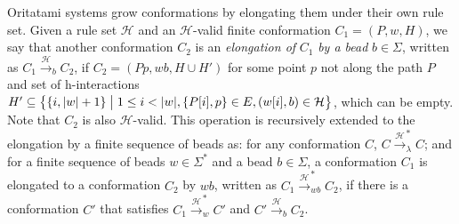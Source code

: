 \documentclass[dvipdfmx,review]{elsarticle}
\begin{document}
Oritatami systems grow conformations by elongating them under their own rule set. 
Given a rule set $\mathcal{H}$ and an $\mathcal{H}$-valid finite conformation $C_1 = (P, w, H)$, 
we say that another conformation $C_2$ is an \textit{elongation of} $C_1$ \textit{by a bead} $b \in \Sigma$, written as $C_1 \xrightarrow{\mathcal{H}}_b C_2$, if $C_2 = (Pp, wb, H \cup H')$ for some point $p$ not along the path $P$ and set of h-interactions $H' \subseteq \left\{ \{i, |w|+1\} \bigm| 1\leq i < |w|, \{P[i], p\} \in E, (w[i], b) \in \mathcal{H}\right\}$, which can be empty.
Note that $C_2$ is also $\mathcal{H}$-valid.
This operation is recursively extended to the elongation by a finite sequence of beads as: 
for any conformation $C$, $C \xrightarrow{\mathcal{H}}^*_\lambda C$; 
and for a finite sequence of beads $w \in \Sigma^*$ and a bead $b \in \Sigma$,
a conformation $C_1$ is elongated to a conformation $C_2$ by $wb$,
written as $C_1 \xrightarrow{\mathcal{H}}^*_{wb} C_2$, if there is a conformation $C'$ that satisfies
$C_1 \xrightarrow{\mathcal{H}}^*_w C'$ and $C' \xrightarrow{\mathcal{H}}_b C_2$.
\end{document}
